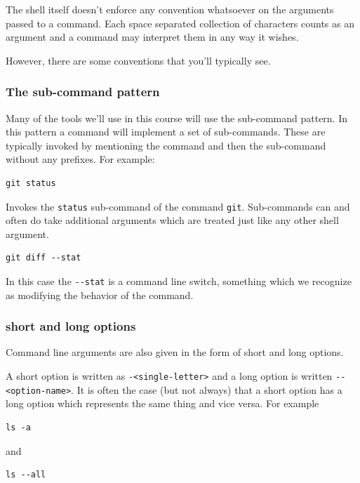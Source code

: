 \documentclass[11pt]{article}
\begin{document}
The shell itself doesn't enforce any convention whatsoever on the
arguments passed to a command. Each space separated collection of
characters counts as an argument and a command may interpret them
in any way it wishes.

However, there are some conventions that you'll typically see.

\subsubsection{The sub-command pattern}
\label{sec:orgd311d54}

Many of the tools we'll use in this course will use the
sub-command pattern. In this pattern a command will implement a
set of sub-commands. These are typically invoked by mentioning the
command and then the sub-command without any prefixes. For
example:

\begin{verbatim}
git status
\end{verbatim}

Invokes the \texttt{status} sub-command of the command
\texttt{git}. Sub-commands can and often do take additional arguments
which are treated just like any other shell argument.

\begin{verbatim}
git diff --stat
\end{verbatim}

In this case the \texttt{-{}-stat} is a command line switch, something
which we recognize as modifying the behavior of the command.

\subsubsection{short and long options}
\label{sec:org2946f5e}

Command line arguments are also given in the form of short and
long options.

A short option is written as \texttt{-<single-letter>} and a long option
is written \texttt{-{}-<option-name>}. It is often the case (but not
always) that a short option has a long option which represents the
same thing and vice versa. For example

\begin{verbatim}
ls -a
\end{verbatim}

and

\begin{verbatim}
ls --all 
\end{verbatim}
\end{document}
